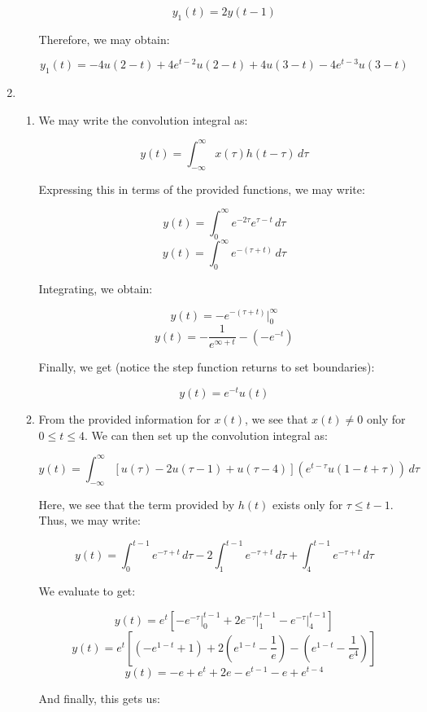 \begin{enumerate}
\begin{enumerate}
        $$y_1(t)=2y(t-1)$$

        Therefore, we may obtain:

        $$\boxed{y_1(t)=-4u(2-t)+4e^{t-2}u(2-t)+4u(3-t)-4e^{t-3}u(3-t)}$$

    \end{enumerate}

  \item

    \begin{enumerate}

      \item We may write the convolution integral as:

        $$y(t)=\int_{-\infty}^{\infty} x(\tau)h(t-\tau)\,d\tau$$

        Expressing this in terms of the provided functions, we may write:

        $$y(t)=\int_{0}^{\infty} e^{-2\tau}e^{\tau-t}\,d\tau$$
        $$y(t)=\int_{0}^{\infty} e^{-(\tau+t)}\,d\tau$$

        Integrating, we obtain:

        $$y(t)= -e^{-(\tau+t)}\Big|_{0}^{\infty}$$
        $$y(t)= -\frac{1}{e^{\infty+t}}-\left( -e^{-t} \right)$$

        Finally, we get (notice the step function returns to set boundaries):

        $$\boxed{y(t)=e^{-t}u(t)}$$

      \item From the provided information for $x(t)$, we see that $x(t)\neq0$ only for $0\leq t\leq 4$. We can then set up the convolution integral as:

        $$y(t)=\int_{-\infty}^{\infty} [u(\tau)-2u(\tau-1)+u(\tau-4)](e^{t-\tau}u(1-t+\tau))\,d\tau$$

        Here, we see that the term provided by $h(t)$ exists only for $\tau\leq t-1$. Thus, we may write:

        $$y(t)=\int_{0}^{t-1} e^{-\tau+t}\,d\tau-2\int_{1}^{t-1} e^{-\tau+t}\,d\tau+\int_{4}^{t-1} e^{-\tau+t}\,d\tau$$

        We evaluate to get:

        $$y(t)=e^t\left[-e^{-\tau}\Big|_0^{t-1}+2e^{-\tau}\Big|_{1}^{t-1}-e^{-\tau}\Big|_4^{t-1}\right]$$
        $$y(t)=e^t\left[(-e^{1-t}+1)+2\left( e^{1-t}-\frac{1}{e} \right)-\left(e^{1-t}-\frac{1}{e^4}\right)\right]$$
        $$y(t)=-e+e^t+2e-e^{t-1}-e+e^{t-4}$$

        And finally, this gets us:


\end{enumerate}
\end{enumerate}
